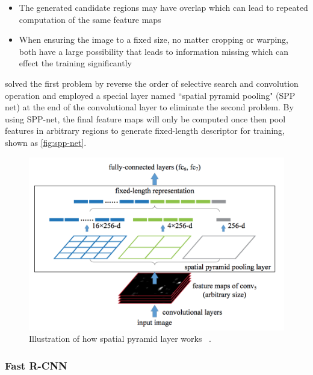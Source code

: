 \begin{itemize}
    \item The generated candidate regions may have overlap which can lead to
    repeated computation of the same feature maps

    \item When ensuring the image to a fixed size, no matter cropping or warping,
    both have a large possibility that leads to information missing which can
    effect the training significantly
\end{itemize}

\cite{spp-net-paper-2014} solved the first problem by reverse the order of
selective search and convolution operation
and employed a special layer named ``spatial pyramid pooling" (SPP net) at the
end of the convolutional layer to eliminate
the second problem. By using SPP-net, the final feature maps will only be
computed once then pool features in arbitrary
regions to generate fixed-length descriptor for training, shown as
\autoref{fig:spp-net}.


\begin{figure}
    \begin{center}
    \includegraphics[scale=0.7]{figures/spp_net.png}
    \end{center}
    \caption{Illustration of how spatial pyramid layer works
    ~\protect\cite{spp-net-paper-2014}.}
    \label{fig:spp-net}
\end{figure}


\subsubsection{Fast R-CNN}

